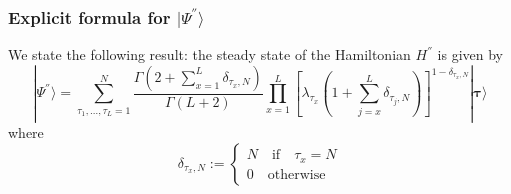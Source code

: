 \documentclass[10pt]{article}
\numberwithin{equation}{section}
\numberwithin{equation}{subsection}
\begin{document}

\subsubsection{Explicit formula for $|\Psi^{''}\rangle$}\label{subsectionSSHsec}
We state the following result: the steady state of the Hamiltonian $H^{''}$ is given by 
\begin{equation}\label{ResulsBasis}
	|\Psi^{''} \rangle=\sum_{\tau_{1},\ldots,\tau_{L}=1}^{N}\frac{\Gamma\left(2+\sum_{x=1}^{L}\delta_{\tau_{x},N}\right)}{\Gamma\left(L+2\right)}\prod_{x=1}^{L}\left[\lambda_{\tau_{x}}\left(1+\sum_{j=x}^{L}\delta_{\tau_{j},N}\right)\right]^{1-\delta_{\tau_{x},N}}|\mathbf{\bm{\tau}}\rangle
\end{equation}
where 
\begin{equation}
    \delta_{\tau_{x},N}:=\begin{cases}
        N\quad \text{if}\quad \tau_{x}=N\\
        0\quad \text{otherwise}
    \end{cases}
\end{equation}
\end{document}
